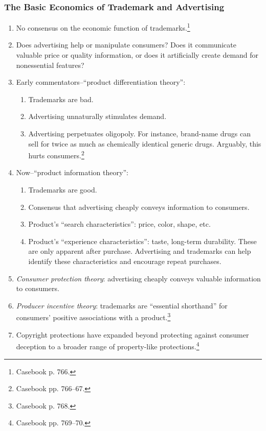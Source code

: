 \subsubsection{The Basic Economics of Trademark and Advertising}

\begin{enumerate}
    \item No consensus on the economic function of 
    trademarks.\footnote{Casebook p. 766.}
    \item Does advertising help or manipulate consumers? Does it communicate 
    valuable price or quality information, or does it artificially create 
    demand for nonessential features?
    \item Early commentators--``product differentiation theory'':
    \begin{enumerate}
        \item Trademarks are bad.
        \item Advertising unnaturally stimulates demand.
        \item Advertising perpetuates oligopoly. For instance, brand-name 
        drugs can sell for twice as much as chemically identical generic 
        drugs. Arguably, this hurts consumers.\footnote{Casebook pp. 766--67.}
    \end{enumerate}
    \item Now--``product information theory'':
    \begin{enumerate}
        \item Trademarks are good.
        \item Consensus that advertising cheaply conveys information to 
        consumers.
        \item Product's ``search characteristics'': price, color, shape, etc.
        \item Product's ``experience characteristics'': taste, long-term 
        durability. These are only apparent after purchase. Advertising and 
        trademarks can help identify these characteristics and encourage 
        repeat purchases.
    \end{enumerate}
    \item \emph{Consumer protection theory}: advertising cheaply conveys 
    valuable information to consumers.
    \item \emph{Producer incentive theory}: trademarks are ``essential 
    shorthand'' for consumers' positive associations with a 
    product.\footnote{Casebook p. 768.}
    \item Copyright protections have expanded beyond protecting against 
    consumer deception to a broader range of property-like 
    protections.\footnote{Casebook pp. 769--70.}
\end{enumerate}

